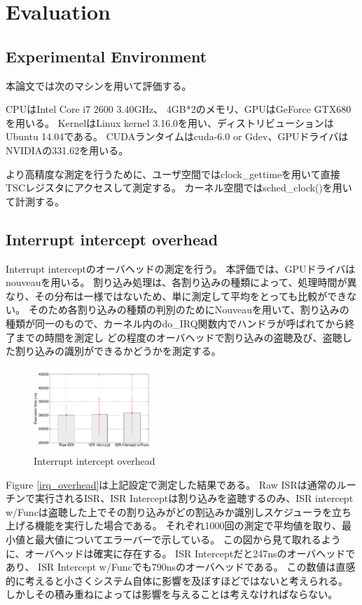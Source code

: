 \section{Evaluation}

\subsection{Experimental Environment}
本論文では次のマシンを用いて評価する。

CPUはIntel Core i7 2600 3.40GHz、
4GB*2のメモリ、GPUはGeForce GTX680を用いる。
KernelはLinux kernel 3.16.0を用い、ディストリビューションはUbuntu 14.04である。
CUDAランタイムはcuda-6.0 or Gdev、GPUドライバはNVIDIAの331.62を用いる。

より高精度な測定を行うために、ユーザ空間ではclock\_gettimeを用いて直接TSCレジスタにアクセスして測定する。
カーネル空間ではsched\_clock()を用いて計測する。

\subsection{Interrupt intercept overhead}
Interrupt interceptのオーバヘッドの測定を行う。
本評価では、GPUドライバはnouveauを用いる。
割り込み処理は、各割り込みの種類によって、処理時間が異なり、その分布は一様ではないため、単に測定して平均をとっても比較ができない。
そのため各割り込みの種類の判別のためにNouveauを用いて、割り込みの種類が同一のもので、カーネル内のdo\_IRQ関数内でハンドラが呼ばれてから終了までの時間を測定し
どの程度のオーバヘッドで割り込みの盗聴及び、盗聴した割り込みの識別ができるかどうかを測定する。

\begin{figure}[t]
\begin{center}
\includegraphics[width=0.4\textwidth]{graph/interrupt.pdf}
\caption{Interrupt intercept overhead}
\end{center}
\label{fig:irq_overhead}
\end{figure}

Figure \ref{irq_overhead}は上記設定で測定した結果である。
Raw ISRは通常のルーチンで実行されるISR、ISR Interceptは割り込みを盗聴するのみ、ISR intercept w/Funcは盗聴した上でその割り込みがどの割込みか識別しスケジューラを立ち上げる機能を実行した場合である。
それぞれ1000回の測定で平均値を取り、最小値と最大値についてエラーバーで示している。
この図から見て取れるように、オーバヘッドは確実に存在する。
ISR Interceptだと247nsのオーバヘッドであり、
ISR Intercept w/Funcでも790nsのオーバヘッドである。
この数値は直感的に考えると小さくシステム自体に影響を及ぼすほどではないと考えられる。
しかしその積み重ねによっては影響を与えることは考えなければならない。

